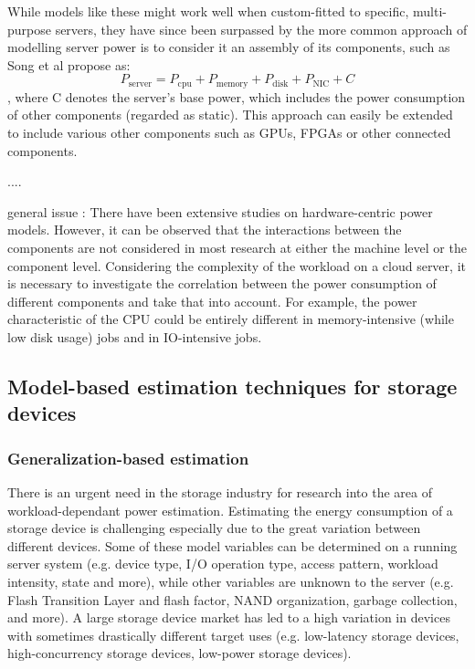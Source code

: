 While models like these might work well when custom-fitted to specific, multi-purpose servers, they have since been surpassed by the more common approach of modelling server power is to consider it an assembly of its components, such as Song et al\parencite{song2013unified} propose as:
\begin{equation}
    P_{\text{server}} = P_{\text{cpu}} + P_{\text{memory}} + P_{\text{disk}} + P_{\text{NIC}} + C
\end{equation}
, where C denotes the server's base power, which includes the power consumption of other components (regarded as static). This approach can easily be extended to include various other components such as GPUs, FPGAs or other connected components.


....

general issue \parencite{lin2020taxonomy}: There have been extensive studies on hardware-centric power models. However, it can be observed that the interactions between the components are not considered in most research at either the machine level or the component level. Considering the complexity of the workload on a cloud server, it is necessary to investigate the correlation between the power consumption of different components and take that into account. For example, the power characteristic of the CPU could be entirely different in memory-intensive (while low disk usage) jobs and in IO-intensive jobs.


\subsection{Model-based estimation techniques for storage devices}
\label{sec:model-based_storage_power}

\subsubsection{Generalization-based estimation}
There is an urgent need in the storage industry for research into the area of workload-dependant power estimation\parencite{allaloufStorageModelingPower2009}. Estimating the energy consumption of a storage device is challenging especially due to the great variation between different devices. Some of these model variables can be determined on a running server system (e.g. device type, I/O operation type, access pattern, workload intensity, state and more), while other variables are unknown to the server (e.g. Flash Transition Layer and flash factor, NAND organization, garbage collection, and more). A large storage device market has led to a high variation in devices with sometimes drastically different target uses (e.g. low-latency storage devices, high-concurrency storage devices, low-power storage devices).

